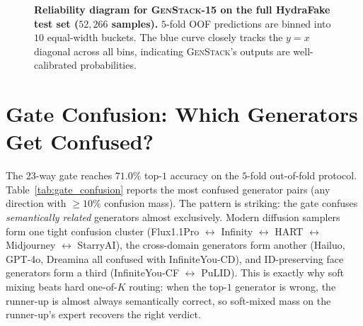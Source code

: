 \documentclass[10pt,twocolumn,letterpaper]{article}
\begin{document}
\begin{figure}[t]
\centering
{}
\caption{\textbf{Reliability diagram for \textsc{GenStack-15} on the full HydraFake test set ($52{,}266$ samples).} $5$-fold OOF predictions are binned into $10$ equal-width buckets. The blue curve closely tracks the $y{=}x$ diagonal across all bins, indicating \textsc{GenStack}'s outputs are well-calibrated probabilities.}
\label{fig:calibration}
\end{figure}

\section{Gate Confusion: Which Generators Get Confused?}
\label{sec:gate_confusion}

The $23$-way gate reaches $71.0\%$ top-$1$ accuracy on the $5$-fold out-of-fold protocol. Table~\ref{tab:gate_confusion} reports the most confused generator pairs (any direction with $\ge\!10\%$ confusion mass). The pattern is striking: the gate confuses \emph{semantically related} generators almost exclusively. Modern diffusion samplers form one tight confusion cluster (Flux1.1Pro $\leftrightarrow$ Infinity $\leftrightarrow$ HART $\leftrightarrow$ Midjourney $\leftrightarrow$ StarryAI), the cross-domain generators form another (Hailuo, GPT-4o, Dreamina all confused with InfiniteYou-CD), and ID-preserving face generators form a third (InfiniteYou-CF $\leftrightarrow$ PuLID). This is exactly why soft mixing beats hard one-of-$K$ routing: when the top-$1$ generator is wrong, the runner-up is almost always semantically correct, so soft-mixed mass on the runner-up's expert recovers the right verdict.
\end{document}
